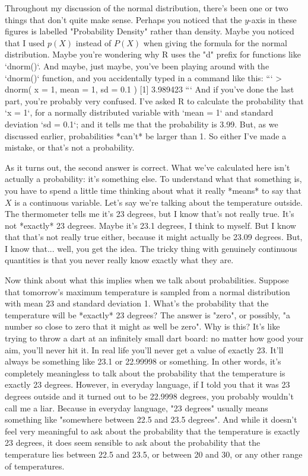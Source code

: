 Throughout my discussion of the normal distribution, there's been one or two things that don't quite make sense. Perhaps you noticed that the $y$-axis in these figures is labelled "Probability Density" rather than density. Maybe you noticed that I used $p(X)$ instead of $P(X)$ when giving the formula for the normal distribution. Maybe you're wondering why R uses the "d" prefix for functions like `dnorm()`. And maybe, just maybe, you've been playing around with the `dnorm()` function, and you accidentally typed in a command like this:
```
> dnorm( x = 1, mean = 1, sd = 0.1 )
[1] 3.989423
```
And if you've done the last part, you're probably very confused. I've asked R to calculate the probability that `x = 1`, for a normally distributed variable with `mean = 1` and standard deviation `sd = 0.1`; and it tells me that the probability is 3.99. But, as we discussed earlier, probabilities *can't* be larger than 1. So either I've made a mistake, or that's not a probability. 

As it turns out, the second answer is correct. What we've calculated here isn't actually a probability: it's something else. To understand what that something is, you have to spend a little time thinking about what it really *means* to say that $X$ is a continuous variable. Let's say we're talking about the temperature outside. The thermometer tells me it's 23 degrees, but I know that's not really true. It's not *exactly* 23 degrees. Maybe it's 23.1 degrees, I think to myself. But I know that that's not really true either, because it might actually be 23.09 degrees. But, I know that... well, you get the idea. The tricky thing with genuinely continuous quantities is that you never really know exactly what they are.

Now think about what this implies when we talk about probabilities. Suppose that tomorrow's maximum temperature is sampled from a normal distribution with mean 23 and standard deviation 1. What's the probability that the temperature will be *exactly* 23 degrees? The answer is "zero", or possibly, "a number so close to zero that it might as well be zero". Why is this? It's like trying to throw a dart at an infinitely small dart board: no matter how good your aim, you'll never hit it. In real life you'll never get a value of exactly 23. It'll always be something like 23.1 or 22.99998 or something. In other words, it's completely meaningless to talk about the probability that the temperature is exactly 23 degrees. However, in everyday language, if I told you that it was 23 degrees outside and it turned out to be 22.9998 degrees, you probably wouldn't call me a liar. Because in everyday language, "23 degrees" usually means something like "somewhere between 22.5 and 23.5 degrees". And while it doesn't feel very meaningful to ask about the probability that the temperature is exactly 23 degrees, it does seem sensible to ask about the probability that the temperature lies between 22.5 and 23.5, or between 20 and 30, or any other range of temperatures. 

